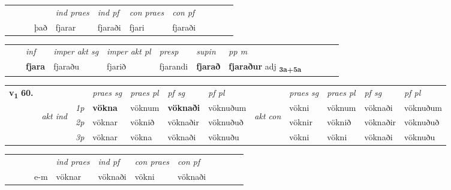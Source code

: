 \begin{tabular}{llllllllllll}
 & &  & &  \textit{ind praes} & \textit{ind pf} & \textit{con praes} & \textit{con pf} \\*
&  & & það & fjarar & fjaraði & fjari & fjaraði \\*
\cmidrule{5-9}
\end{tabular}


\begin{tabular}{llllllllllll}
 & & \textit{inf} & \textit{imper akt sg} & \textit{imper akt pl}   & \textit{presp} & \textit{supin}  & \textit{pp m}     \\*
  & & \textbf{fjara} & fjaraðu  & fjarið   & fjarandi &  \textbf{fjarað}  & \textbf{fjaraður} adj \textbf{\textsubscript{3a+5a}} \\*
\cmidrule{1-12}
\end{tabular}



\begin{tabular}{llllllllllll} \toprule
\multirow{4}{*}{{{\textbf{v{\textsubscript{1}}} \Large{\textbf{60.}}}}}  & &   &  \textit{praes sg}  & \textit{praes pl}  &\textit{ pf sg} & \textit{pf pl} &  &  \textit{praes sg}  & \textit{praes pl}  & \textit{pf sg} & \textit{pf pl } \\*
	\cmidrule{4-7} \cmidrule{9-12}
 & \multirow{3}{*}{\begin{turn}{90}\textit{akt ind}\end{turn}} & {\textit{1p}} & \textbf{vökna} & vöknum    & \textbf{vöknaði} & vöknuðum & \multirow{3}{*}{\begin{turn}{90}\textit{akt con}\end{turn}} &vökni & vöknum & vöknaði & vöknuðum\\*
& &  {\textit{2p}} &  vöknar  & vöknið   & vöknaðir & vöknuðuð & & vöknir & vöknið & vöknaðir & vöknuðuð \\*
& &  {\textit{3p}} & vöknar & vökna   & vöknaði & vöknuðu & & vökni & vökni& vöknaði & vöknuðu  \\*
\cmidrule{4-7} \cmidrule{9-12}
\end{tabular}


\begin{tabular}{llllllllllll}
 & &  & &  \textit{ind praes} & \textit{ind pf} & \textit{con praes} & \textit{con pf} \\*
&  & & e-m & vöknar & vöknaði & vökni & vöknaði \\*
\cmidrule{5-9}
\end{tabular}


